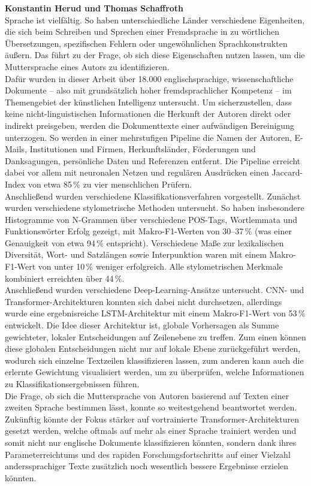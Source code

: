\documentclass[bachelor,german]{info1thesis}
\begin{document}
\textbf{Konstantin Herud und Thomas Schaffroth} \\
Sprache ist vielfältig. So haben unterschiedliche Länder verschiedene Eigenheiten, die sich beim Schreiben und Sprechen einer Fremdsprache in zu wörtlichen Übersetzungen, spezifischen Fehlern oder ungewöhnlichen Sprachkonstrukten äußern. Das führt zu der Frage, ob sich diese Eigenschaften nutzen lassen, um die Muttersprache eines Autors zu identifizieren. \\
Dafür wurden in dieser Arbeit über 18.000 englischsprachige, wissenschaftliche Dokumente -- also mit grundsätzlich hoher fremdsprachlicher Kompetenz -- im Themengebiet der künstlichen Intelligenz untersucht.
Um sicherzustellen, dass keine nicht-linguistischen Informationen die Herkunft der Autoren direkt oder indirekt preisgeben, werden die Dokumenttexte einer aufwändigen Bereinigung unterzogen. So werden in einer mehrstufigen Pipeline die Namen der Autoren, E-Mails, Institutionen und Firmen, Herkunftsländer, Förderungen und Danksagungen, persönliche Daten und Referenzen entfernt. Die Pipeline erreicht dabei vor allem mit neuronalen Netzen und regulären Ausdrücken einen Jaccard-Index von etwa 85\,\% zu vier menschlichen Prüfern. \\
Anschließend wurden verschiedene Klassifikationsverfahren vorgestellt. Zunächst wurden verschiedene stylometrische Methoden untersucht. So haben insbesondere Histogramme von N-Grammen über verschiedene POS-Tags, Wortlemmata und Funktionswörter Erfolg gezeigt, mit Makro-F1-Werten von 30--37\,\% (was einer Genauigkeit von etwa 94\,\% entspricht). Verschiedene Maße zur lexikalischen Diversität, Wort- und Satzlängen sowie Interpunktion waren mit einem Makro-F1-Wert von unter 10\,\% weniger erfolgreich. Alle stylometrischen Merkmale kombiniert erreichten über 44\,\%. \\
Anschließend wurden verschiedene Deep-Learning-Ansätze untersucht. CNN- und Trans\-former-Architekturen konnten sich dabei nicht durchsetzen, allerdings wurde eine ergebnisreiche LSTM-Architektur mit einem Makro-F1-Wert von 53\,\% entwickelt. Die Idee dieser Architektur ist, globale Vorhersagen als Summe gewichteter, lokaler Entscheidungen auf Zeilenebene zu treffen. Zum einen können diese globalen Entscheidungen nicht nur auf lokale Ebene zurückgeführt werden, wodurch sich einzelne Textzeilen klassifizieren lassen, zum anderen kann auch die erlernte Gewichtung visualisiert werden, um zu überprüfen, welche Informationen zu Klassifikationsergebnissen führen. \\
Die Frage, ob sich die Muttersprache von Autoren basierend auf Texten einer zweiten Sprache bestimmen lässt, konnte so weitestgehend beantwortet werden. \\
Zukünftig könnte der Fokus stärker auf vortrainierte Transformer-Architekturen gesetzt werden, welche oftmals auf mehr als einer Sprache trainiert werden und somit nicht nur englische Dokumente klassifizieren könnten, sondern dank ihres Parameterreichtums und des rapiden Forschungsfortschritts auf einer Vielzahl anderssprachiger Texte zusätzlich noch wesentlich bessere Ergebnisse erzielen könnten.
\end{document}
